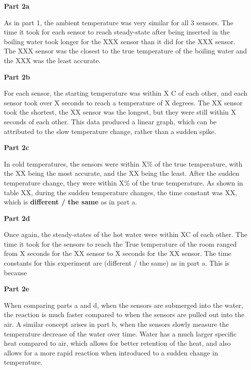 \documentclass{article}
\begin{document}

\textbf{Part 2a}

As in part 1, the ambient temperature was very similar for all 3 sensors.  The time it took for each sensor to reach steady-state after being inserted in the boiling water took longer for the XXX sensor than it did for the XXX sensor.  The XXX sensor was the closest to the true temperature of the boiling water and the XXX was the least accurate.  %

\textbf{Part 2b}

For each sensor, the starting temperature was within X \degree C of each other, and each sensor took over X seconds to reach a temperature of X %
degrees.  The XX sensor took the shortest, the XX sensor was the longest, but they were still within X seconds of each other.  This data produced a linear graph, which can be attributed to the slow temperature change, rather than a sudden spike.  %

\textbf{Part 2c}

In cold temperatures, the sensors were within X\% of the true temperature, with the XX being the most accurate, and the XX being the least.  After the sudden temperature change, they were within X\% of the true temperature.  As shown in table XX, during the sudden temperature changes, the time constant was XX, which is \textbf{different / the same} as in part a.  

\textbf{Part 2d}

Once again, the steady-states of the hot water were within X\degree C of each other.  The time it took for the sensors to reach the True temperature of the room ranged from X seconds for the XX sensor to X seconds for the XX sensor.  The time constants for this experiment are (different / the same) as in part a.  This is because %

\textbf{Part 2e}

When comparing parts a and d, when the sensors are submerged into the water, the reaction is much faster compared to when the sensors are pulled out into the air.  A similar concept arises in part b, when the sensors slowly measure the temperature decrease of the water over time.  Water has a much larger specific heat compared to air, which allows for better retention of the heat, and also allows for a more rapid reaction when introduced to a sudden change in temperature.  
\end{document}
